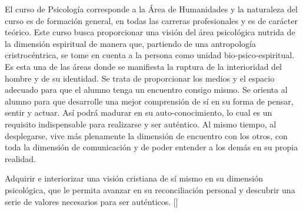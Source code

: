 \begin{syllabus}


\begin{justification}
El curso de Psicología corresponde a la Área de Humanidades y la naturaleza del curso es de formación general, en todas las carreras profesionales y es de carácter teórico.
Este curso busca proporcionar una visión del área psicológica nutrida de la dimensión espiritual de manera que, partiendo de una antropología cristrocéntrica, se tome en cuenta a la persona como unidad bio-psico-espiritual. Es esta una de las áreas donde se manifiesta la ruptura de la interioridad del hombre y de su identidad.
Se trata de proporcionar los medios y el espacio adecuado para que el alumno tenga un encuentro consigo mismo. Se orienta al alumno para que desarrolle una mejor comprensión de sí en su forma de pensar, sentir y actuar. Así podrá madurar en su auto-conocimiento, lo cual es un requisito indispensable para realizarse y ser auténtico. Al mismo tiempo, al desplegarse, vive más plenamente la dimensión de encuentro con los otros, con toda la dimensión de comunicación y de poder entender a los demás en su propia realidad.
\end{justification}

\begin{goals}
\item Adquirir e interiorizar una visión cristiana de sí mismo en su dimensión psicológica, que le permita avanzar en su reconciliación personal y descubrir una serie de valores necesarios para ser auténticos. [\Usage]
\end{goals}

\begin{outcomes}
    \item {}
    \item {}
    \item {}
    \item {}
\end{outcomes}

\begin{competences}
    \item {}
    \item {}
    \item {} 
    \item {}
\end{competences}


\end{syllabus}
